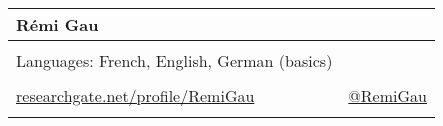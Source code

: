 \documentclass[a4paper,12pt,oneside]{letter}
\date{2017-01-11}
\begin{document}
\newcommand{\myheader}{
\begin{tabular*}{7in}{l@{\extracolsep{\fill}}r}

	\textbf{{\LARGE Rémi Gau}}  & \\
	\hline\hline	\\ %
	Languages: French, English, German (basics)\\
	\\
	\href{http://www.researchgate.net/profile/Remi\textunderscore Gau}{researchgate.net/profile/Remi\textunderscore Gau} & \href{http://www.twitter.com/RemiGau}{@RemiGau} \\
	\\
	\hline\hline
	\end{tabular*}}

\myheader

\setlength\minrowclearance{0.2cm}
\setlength\arrayrulewidth{2pt}
\end{document}
